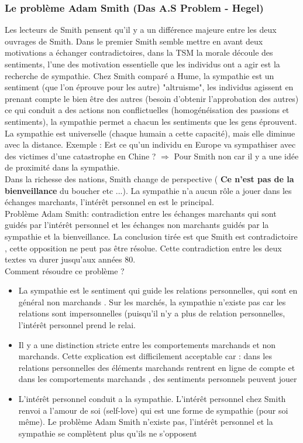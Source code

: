 \documentclass{article}
\begin{document}
\subsubsection{Le problème Adam Smith (Das A.S Problem - Hegel)}
Les lecteurs de Smith pensent qu'il y a un différence majeure entre les deux ouvrages de Smith. Dans le premier Smith semble mettre en avant deux motivations a échanger contradictoires, dans la TSM la morale découle des sentiments, l'une des motivation essentielle que les individus ont a agir est la recherche de sympathie. Chez Smith comparé a Hume, la sympathie est un sentiment (que l'on éprouve pour les autre) "altruisme", les individus agissent en prenant compte le bien être des autres (besoin d'obtenir l'approbation des autres) ce qui conduit a des actions non conflictuelles (homogénéisation des passions et sentiments), la sympathie permet a chacun les sentiments que les gens éprouvent. \\

La sympathie est universelle (chaque humain a cette capacité), mais elle diminue avec la distance. Exemple : Est ce qu'un individu en Europe va sympathiser avec des victimes d'une catastrophe en Chine ? $\Rightarrow$ Pour Smith non car il y a une idée de proximité dans la sympathie. \\

Dans la richesse des nations, Smith change de perspective ( \textbf{Ce n'est pas de la bienveillance} du boucher etc ...). La sympathie n'a aucun rôle a jouer dans les échanges marchants, l'intérêt personnel en est le principal. \\

Problème Adam Smith: contradiction entre les échanges marchants qui sont guidés par l'intérêt personnel et les échanges non marchants guidés par la sympathie et la bienveillance. La conclusion tirée est que Smith est contradictoire , cette opposition ne peut pas être résolue. Cette contradiction entre les deux textes va durer jusqu'aux années 80. \\

Comment résoudre ce problème ? \\
\begin{itemize}
	\item 	La sympathie est le sentiment qui guide les relations personnelles, qui sont en général non marchands . Sur les marchés, la sympathie n'existe pas car les relations sont impersonnelles  (puisqu'il n'y a plus de relation personnelles, l'intérêt personnel prend le relai.
	\item Il y a une distinction stricte entre les comportements marchands et non marchands. Cette explication est difficilement acceptable car : dans les relations personnelles des éléments marchands rentrent en ligne de compte et dans les comportements marchands , des sentiments personnels peuvent jouer
	\item L'intérêt personnel conduit a la sympathie. L'intérêt personnel chez Smith renvoi a l'amour de soi (self-love) qui est une forme de sympathie (pour soi même). Le problème Adam Smith n'existe pas, l'intérêt personnel et la sympathie se complètent plus qu'ils ne s'opposent
\end{itemize}
\end{document}
